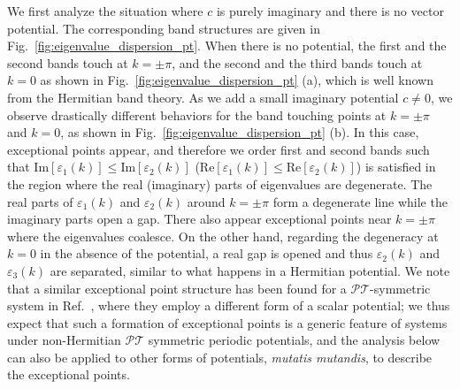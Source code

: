 \documentclass[prb,superscriptaddress,floatfix,twocolumn,showpacs]{revtex4-2}
\begin{document}
We first analyze the situation where $c$ is purely imaginary and there is no vector potential. 
The corresponding band structures are given in Fig.~\ref{fig:eigenvalue_dispersion_pt}. 
When there is no potential, the first and the second bands touch at $k = \pm \pi$, and the second and the third bands touch at $k = 0$ as shown in Fig.~\ref{fig:eigenvalue_dispersion_pt} (a), which is well known from the Hermitian band theory. 
As we add a small imaginary potential $c \neq 0$, we observe drastically different behaviors for the band touching points at $k = \pm \pi$ and $k = 0$, as shown in Fig.~\ref{fig:eigenvalue_dispersion_pt} (b). 
In this case, exceptional points appear, and therefore we order first and second bands such that $\mathrm{Im}[\varepsilon_1(k)]\leq\mathrm{Im}[\varepsilon_{2}(k)]$ ($\mathrm{Re}[\varepsilon_1(k)]\leq\mathrm{Re}[\varepsilon_{2}(k)]$) is satisfied in the region where the real (imaginary) parts of eigenvalues are degenerate.
The real parts of $\varepsilon_1(k)$ and $\varepsilon_2(k)$ around $k = \pm \pi$ form a degenerate line while the imaginary parts open a gap. There also appear exceptional points near $k = \pm \pi$ where the eigenvalues coalesce. 
On the other hand, regarding the degeneracy at $k=0$ in the absence of the potential, a real gap is opened and thus $\varepsilon_2(k)$ and $\varepsilon_3(k)$ are separated, similar to what happens in a Hermitian potential.
We note that a similar exceptional point structure has been found for a $\mathcal{PT}$-symmetric system in Ref.~\cite{makris2008beam}, where they employ a different form of a scalar potential; we thus expect that such a formation of exceptional points is a generic feature of systems under non-Hermitian $\mathcal{PT}$ symmetric periodic potentials, and the analysis below can also be applied to other forms of potentials, \textit{mutatis mutandis}, to describe the exceptional points.
\end{document}

